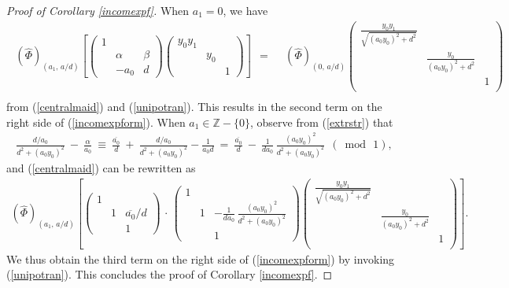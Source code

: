 \documentclass[11pt,reqno]{amsart}
\theoremstyle{definition}
\theoremstyle{definition}
\theoremstyle{remark}
\newcommand{\Z}{\ensuremath{\mathbb{Z}}}
\numberwithin{equation}{section}
\begin{document}
\begin{proof}[Proof of Corollary \ref{incomexpf}]
When $a_{1}=0$, we have 
\begin{align}
	 \hspace{5pt}	\left(\widehat{\Phi}\right)_{(a_{1},\,  a/d)}  \left[\begin{pmatrix}
		1 &            &         \\
		& \alpha & \beta \\
		& -a_{0} & d
	\end{pmatrix}
	\begin{pmatrix}
		y_{0}y_{1}&  & \\
		& y_{0} & \\
		&           & 1
	\end{pmatrix}\right] \ \ = \ \    &  	\left(\widehat{\Phi}\right)_{(0,\,  a/d)}\begin{pmatrix}
	\frac{y_{0} y_{1}}{\sqrt{(a_{0}y_{0})^2+d^2}} &  &  \\
	& \frac{y_{0}}{(a_{0} y_{0})^2+d^2} &  \\
	&  & 1 \\
\end{pmatrix} \nonumber\\
\end{align}
from  (\ref{centralmaid}) and   (\ref{unipotran}).  This  results in the second term on the right side of (\ref{incomexpform}). When  $a_{1}\in \Z-\{0\}$,  observe from (\ref{extrstr}) that 
\begin{align*}
	\frac{d/a_{0}}{d^2+(a_{0}y_{0})^2} \ - \ \frac{\alpha}{a_{0}} \ \equiv \    \frac{\overline{a_{0}}}{d} \ + \ 	\frac{d/a_{0}}{d^2+(a_{0}y_{0})^2}   -\frac{1}{a_{0}d} \ = \   \frac{\overline{a_{0}}}{d}  \ - \ \frac{1}{da_{0}}\, \frac{(a_{0}y_{0})^2}{d^2+(a_{0}y_{0})^2} \ \ (\bmod\, 1),
\end{align*}
and  (\ref{centralmaid}) can be rewritten as 
\begin{align*}
		\left(\widehat{\Phi}\right)_{(a_{1},\,  a/d)}\left[ \begin{pmatrix}
		1 &     &    \\
		& 1  &  \overline{a_{0}}/d\\
		&     &    1
	\end{pmatrix} 
	\, \cdot \,  
	\begin{pmatrix}
		1 &     &    \\
		& 1  &    -  \frac{1}{da_{0}}\, \frac{(a_{0}y_{0})^2}{d^2+(a_{0}y_{0})^2} \\ 
		&     &    1
	\end{pmatrix} 
	\begin{pmatrix}
		\frac{y_{0} y_{1}}{\sqrt{(a_{0}y_{0})^2+d^2}} &  &  \\
		& \frac{y_{0}}{(a_{0} y_{0})^2+d^2} &  \\
		&  & 1 \\
	\end{pmatrix}\right]. 
\end{align*}
We thus obtain the third term on the right side of (\ref{incomexpform}) by invoking  (\ref{unipotran}).   This concludes the proof of Corollary  \ref{incomexpf}. 

 \end{proof}
 
\end{document}
